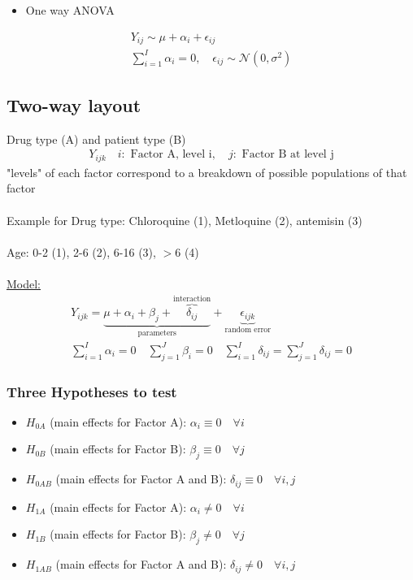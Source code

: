 \begin{itemize}
	\item One way ANOVA
\end{itemize}
\begin{gather*}
	Y_{ij} \sim \mu + \alpha_i + \epsilon_{ij}\\
	\sum_{i=1}^I \alpha_i = 0, \quad \epsilon_{ij} \sim \mathcal{N}(0, \sigma^2)
\end{gather*}
\subsection*{Two-way layout}
\begin{example-N}
	Drug type (A) and patient type (B)
	\begin{gather*}
		Y_{ijk} \quad i: \text{ Factor A, level i}, \quad j: \text{ Factor B at level j}
	\end{gather*}
	"levels" of each factor correspond to a breakdown of possible populations of that factor\\\\
	Example for Drug type: Chloroquine (1), Metloquine (2), antemisin (3)\\\\
	Age: 0-2 (1), 2-6 (2), 6-16 (3), $>$6 (4)\\\\
	\underline{Model:}
	\begin{gather*}
		Y_{ijk} = \underbrace{\mu + \alpha_i + \beta_j + \overbrace{\delta_{ij}}^{\text{interaction}}}_{\text{parameters}} + \underbrace{\epsilon_{ijk}}_{\text{random error}}\\
		\sum_{i=1}^I \alpha_i = 0 \quad \sum_{j=1}^J \beta_i = 0 \quad \sum_{i=1}^I \delta_{ij} = \sum_{j=1}^J \delta_{ij} = 0
	\end{gather*}
	\subsubsection*{Three Hypotheses to test}
	\begin{itemize}
		\item $H_{0A}$ (main effects for Factor A): $\alpha_i \equiv 0 \quad \forall i$
		\item $H_{0B}$ (main effects for Factor B): $\beta_j \equiv 0 \quad \forall j$
		\item $H_{0AB}$ (main effects for Factor A and B): $\delta_{ij} \equiv 0 \quad \forall i, j$\\
		\item $H_{1A}$ (main effects for Factor A): $\alpha_i \neq 0 \quad \forall i$
		\item $H_{1B}$ (main effects for Factor B): $\beta_j \neq 0 \quad \forall j$
		\item $H_{1AB}$ (main effects for Factor A and B): $\delta_{ij} \neq 0 \quad \forall i, j$\\
	\end{itemize}
\end{example-N}

